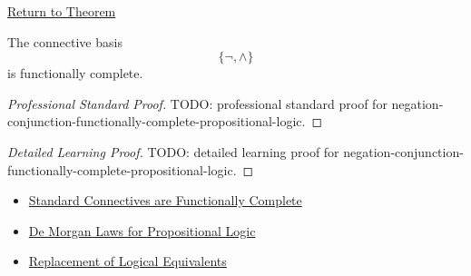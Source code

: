 \newpage
{}
\label{prf:negation-conjunction-functionally-complete-propositional-logic}

\begin{remark*}[Return]
\hyperref[thm:negation-conjunction-functionally-complete-propositional-logic]{Return to Theorem}
\end{remark*}

\begin{theorem*}
The connective basis
\[
\{\neg,\land\}
\]
is functionally complete.
\end{theorem*}

\begin{proof}[Professional Standard Proof]
\LRAProofBodyStart
TODO: professional standard proof for negation-conjunction-functionally-complete-propositional-logic.
\end{proof}

\begin{proof}[Detailed Learning Proof]
\LRAProofBodyStart
TODO: detailed learning proof for negation-conjunction-functionally-complete-propositional-logic.
\end{proof}

\begin{remark*}
\end{remark*}

\begin{dependencies}
\begin{itemize}
  \item \hyperref[thm:standard-connectives-functionally-complete-propositional-logic]{Standard Connectives are Functionally Complete}
  \item \hyperref[thm:de-morgan-laws-propositional-logic]{De Morgan Laws for Propositional Logic}
  \item \hyperref[thm:replacement-of-logical-equivalents-propositional-logic]{Replacement of Logical Equivalents}
\end{itemize}
\end{dependencies}

\clearpage
